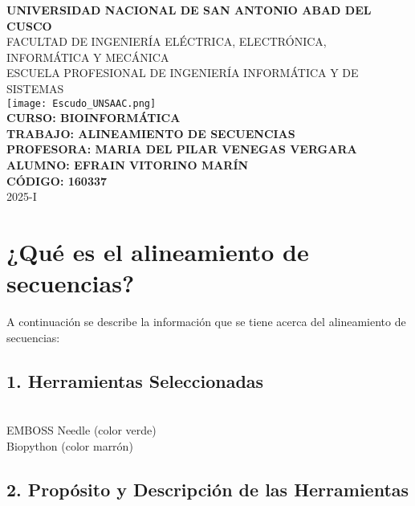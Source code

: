 \documentclass[fleqn,10pt]{article}
\begin{document}
\begin{center}
    {\LARGE\bfseries UNIVERSIDAD NACIONAL DE SAN ANTONIO ABAD DEL CUSCO}\\[0.3cm]
    {\Large FACULTAD DE INGENIERÍA ELÉCTRICA, ELECTRÓNICA, INFORMÁTICA Y MECÁNICA}\\[0.3cm]
    {\Large ESCUELA PROFESIONAL DE INGENIERÍA INFORMÁTICA Y DE SISTEMAS}\\[1cm]
    \texttt{[image: Escudo\_UNSAAC.png]}\\[1cm]
    {\Large\bfseries CURSO: BIOINFORMÁTICA}\\[0.3cm]
    {\Large\bfseries TRABAJO: ALINEAMIENTO DE SECUENCIAS}\\[0.3cm]
    {\Large\bfseries PROFESORA: MARIA DEL PILAR VENEGAS VERGARA}\\[0.3cm]
    {\Large\bfseries ALUMNO: EFRAIN VITORINO MARÍN}\\[0.3cm]
    {\Large\bfseries CÓDIGO: 160337}\\[0.3cm]
    {\Large 2025-I}
\end{center}

\bigskip

\section*{¿Qué es el alineamiento de secuencias?}

A continuación se describe la información que se tiene acerca del alineamiento de secuencias:

\subsection*{1. Herramientas Seleccionadas}
\\
EMBOSS Needle (color verde)\\[0.3em]
Biopython (color marrón)

\subsection*{2. Propósito y Descripción de las Herramientas}
\end{document}
